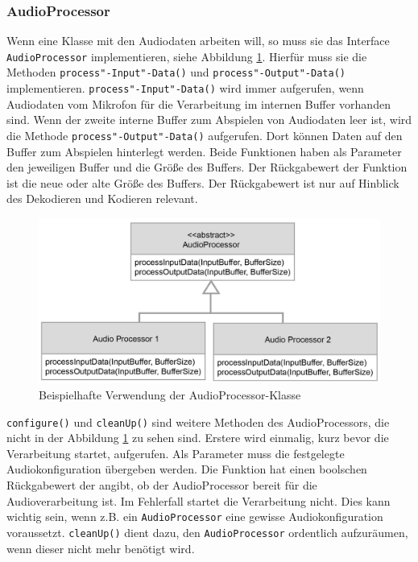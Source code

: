 \subsubsection{AudioProcessor}
Wenn eine Klasse mit den Audiodaten arbeiten will, so muss sie das Interface \texttt{AudioProcessor} implementieren, siehe Abbildung \ref{Fig:AudioProcessorExample}. Hierfür muss sie die Methoden \texttt{process"-Input"-Data()} und \texttt{process"-Output"-Data()} implementieren. \texttt{process"-Input"-Data()} wird immer aufgerufen, wenn Audiodaten vom Mikrofon für die Verarbeitung im internen Buffer vorhanden sind. Wenn der zweite interne Buffer zum Abspielen von Audiodaten leer ist, wird die Methode \texttt{process"-Output"-Data()} aufgerufen. Dort können Daten auf den Buffer zum Abspielen hinterlegt werden. Beide Funktionen haben als Parameter den jeweiligen Buffer und die Größe des Buffers. Der Rückgabewert der Funktion ist die neue oder alte Größe des Buffers. Der Rückgabewert ist nur auf Hinblick des Dekodieren und Kodieren relevant.
\newline
\begin{figure}[htp]
\centering
\includegraphics[width=1\textwidth]{../img/AudioProcessorExample}
\caption{Beispielhafte Verwendung der AudioProcessor-Klasse}
\label{Fig:AudioProcessorExample}
\end{figure}

\texttt{configure()} und \texttt{cleanUp()} sind weitere Methoden des AudioProcessors, die nicht in der Abbildung \ref{Fig:AudioProcessorExample} zu sehen sind. Erstere wird einmalig, kurz bevor die Verarbeitung startet, aufgerufen. Als Parameter muss die festgelegte Audiokonfiguration übergeben werden. Die Funktion hat einen boolschen Rückgabewert der angibt, ob der AudioProcessor bereit für die Audioverarbeitung ist. Im Fehlerfall startet die Verarbeitung nicht. Dies kann wichtig sein, wenn z.B. ein \texttt{AudioProcessor} eine gewisse Audiokonfiguration voraussetzt. \texttt{cleanUp()} dient dazu, den \texttt{AudioProcessor} ordentlich aufzuräumen, wenn dieser nicht mehr benötigt wird.

